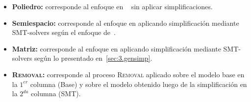 \begin{itemize}
    \item \textbf{Poliedro:} corresponde al enfoque en ~\cite{CarmonaC14} sin aplicar simplificaciones.
    \item \textbf{Semiespacio:} corresponde al enfoque en \cite{CarmonaC14} aplicando simplificación mediante SMT-solvers según el enfoque de~\cite{LeonCB15}.
    \item \textbf{Matriz:} corresponde al enfoque en \cite{CarmonaC14} aplicando simplificación mediante SMT-solvers según lo 
      presentado en~\autoref{sec:3.gensimp}.
    \item \textbf{\textsc{Removal}:} corresponde al proceso \textsc{Removal} aplicado sobre el modelo base en la $1^{er}$ columna (Base) 
      y sobre el modelo obtenido luego de la simplificación en la $2^{da}$ columna (SMT).
\end{itemize}



